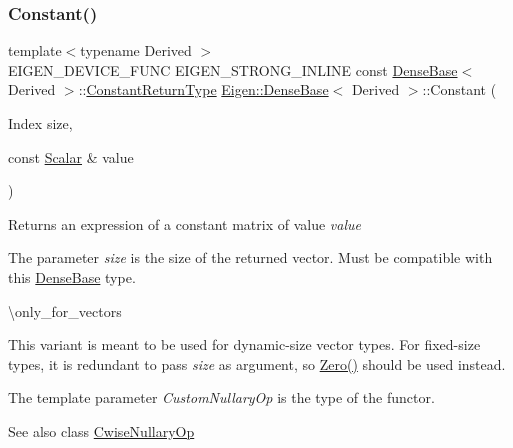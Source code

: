 \subsubsection{\texorpdfstring{Constant()}{Constant()}\hspace{0.1cm}{\footnotesize\ttfamily [2/3]}}
{\footnotesize\ttfamily template$<$typename Derived $>$ \\
E\+I\+G\+E\+N\+\_\+\+D\+E\+V\+I\+C\+E\+\_\+\+F\+U\+NC E\+I\+G\+E\+N\+\_\+\+S\+T\+R\+O\+N\+G\+\_\+\+I\+N\+L\+I\+NE const \mbox{\hyperlink{class_eigen_1_1_dense_base}{Dense\+Base}}$<$ Derived $>$\+::\mbox{\hyperlink{class_eigen_1_1_cwise_nullary_op}{Constant\+Return\+Type}} \mbox{\hyperlink{class_eigen_1_1_dense_base}{Eigen\+::\+Dense\+Base}}$<$ Derived $>$\+::Constant (\begin{DoxyParamCaption}\item[{Index}]{size,  }\item[{const \mbox{\hyperlink{class_eigen_1_1_dense_base_a5feed465b3a8e60c47e73ecce83e39a2}{Scalar}} \&}]{value }\end{DoxyParamCaption})\hspace{0.3cm}{\ttfamily [static]}}

\begin{DoxyReturn}{Returns}
an expression of a constant matrix of value {\itshape value} 
\end{DoxyReturn}
The parameter {\itshape size} is the size of the returned vector. Must be compatible with this \mbox{\hyperlink{class_eigen_1_1_dense_base}{Dense\+Base}} type.

\textbackslash{}only\+\_\+for\+\_\+vectors

This variant is meant to be used for dynamic-\/size vector types. For fixed-\/size types, it is redundant to pass {\itshape size} as argument, so \mbox{\hyperlink{class_eigen_1_1_dense_base_a8c4be762b10041d64a2b2ce85bb14ba0}{Zero()}} should be used instead.

The template parameter {\itshape Custom\+Nullary\+Op} is the type of the functor.

\begin{DoxySeeAlso}{See also}
class \mbox{\hyperlink{class_eigen_1_1_cwise_nullary_op}{Cwise\+Nullary\+Op}} 
\end{DoxySeeAlso}
\mbox{\label{class_eigen_1_1_dense_base_a9053c1a2e9993febe50113b05aac0f20}} 
